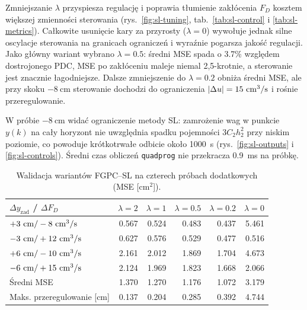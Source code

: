 Zmniejszanie $\lambda$ przyspiesza regulację i poprawia tłumienie zakłócenia $F_D$ kosztem większej zmienności sterowania (rys.~\ref{fig:sl-tuning}, tab.~\ref{tab:sl-control} i \ref{tab:sl-metrics}). Całkowite usunięcie kary za przyrosty ($\lambda=0$) wywołuje jednak silne oscylacje sterowania na granicach ograniczeń i wyraźnie pogarsza jakość regulacji. Jako główny wariant wybrano $\lambda=\num{0.5}$: średni MSE spada o \num{3.7}\% względem dostrojonego PDC, MSE po zakłóceniu maleje niemal 2,5-krotnie, a sterowanie jest znacznie łagodniejsze. Dalsze zmniejszenie do $\lambda=\num{0.2}$ obniża średni MSE, ale przy skoku $-8\ \mathrm{cm}$ sterowanie dochodzi do ograniczenia $|\Delta u|=15\ \mathrm{cm^3/s}$ i rośnie przeregulowanie.

W próbie $-8\ \mathrm{cm}$ widać ograniczenie metody SL: zamrożenie wag w punkcie $y(k)$ na cały horyzont nie uwzględnia spadku pojemności $3C_2h_2^2$ przy niskim poziomie, co powoduje krótkotrwałe odbicie około 1000~s (rys.~\ref{fig:sl-outputs} i \ref{fig:sl-controls}). Średni czas obliczeń \texttt{quadprog} nie przekracza \num{0.9}~ms na próbkę.

\begin{table}[H]
\centering
\caption{Walidacja wariantów FGPC--SL na czterech próbach dodatkowych (MSE [$\mathrm{cm^2}$]).}
\footnotesize
\begin{tabular}{lrrrrr}\toprule
$\Delta y_{\mathrm{zad}}$ / $\Delta F_D$ & $\lambda=2$ & $\lambda=1$ & $\lambda=\num{0.5}$ & $\lambda=\num{0.2}$ & $\lambda=0$\\\midrule
$+3\ \mathrm{cm}/-8\ \jednprzep$  & \num{0.567} & \num{0.524} & \num{0.483} & \num{0.437} & \num{5.461}\\
$-3\ \mathrm{cm}/+12\ \jednprzep$ & \num{0.627} & \num{0.576} & \num{0.529} & \num{0.477} & \num{0.516}\\
$+6\ \mathrm{cm}/-10\ \jednprzep$ & \num{2.161} & \num{2.012} & \num{1.869} & \num{1.704} & \num{4.673}\\
$-6\ \mathrm{cm}/+15\ \jednprzep$ & \num{2.124} & \num{1.969} & \num{1.823} & \num{1.668} & \num{2.066}\\\midrule
Średni MSE                        & \num{1.370} & \num{1.270} & \num{1.176} & \num{1.072} & \num{3.179}\\
Maks. przeregulowanie [cm]        & \num{0.137} & \num{0.204} & \num{0.285} & \num{0.392} & \num{4.744}\\\bottomrule
\end{tabular}
\label{tab:sl-validation}
\end{table}

